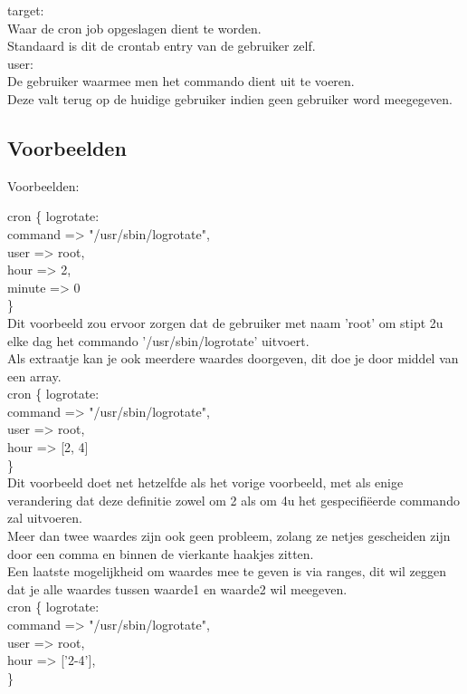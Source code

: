 		target:\\
		Waar de cron job opgeslagen dient te worden.\\
		Standaard is dit de crontab entry van de gebruiker zelf.\\

		user:\\
		De gebruiker waarmee men het commando dient uit te voeren.\\
		Deze valt terug op de huidige gebruiker indien geen gebruiker word meegegeven.\\

\subsection{Voorbeelden}
Voorbeelden:

	cron \{ logrotate:\\
		command => "/usr/sbin/logrotate",\\
		user => root,\\
		hour => 2,\\
		minute => 0\\
	\}\\

	Dit voorbeeld zou ervoor zorgen dat de gebruiker met naam 'root' om stipt 2u elke dag het commando '/usr/sbin/logrotate' uitvoert.\\
	Als extraatje kan je ook meerdere waardes doorgeven, dit doe je door middel van een array.\\

	cron \{ logrotate:\\
		command => "/usr/sbin/logrotate",\\
		user => root,\\
		hour => [2, 4]\\
	\}\\

	Dit voorbeeld doet net hetzelfde als het vorige voorbeeld, met als enige verandering dat deze definitie zowel om 2 als om 4u het gespecifiëerde commando zal uitvoeren.\\
	Meer dan twee waardes zijn ook geen probleem, zolang ze netjes gescheiden zijn door een comma en binnen de vierkante haakjes zitten.\\

	Een laatste mogelijkheid om waardes mee te geven is via ranges, dit wil zeggen dat je alle waardes tussen waarde1 en waarde2 wil meegeven.\\

	cron \{ logrotate:\\
		command => "/usr/sbin/logrotate",\\
		user => root,\\
		hour => ['2-4'],\\
	\}\\

